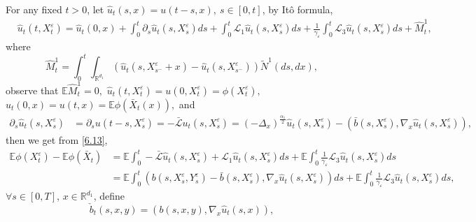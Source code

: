 \documentclass[11pt,reqno]{amsart}
\numberwithin{equation}{section}
\begin{document}
For any fixed $t>0$, let $\hat{u}_{t}(s,x)=u(t-s,x),\ s\in [0,t]$, by It\^{o} formula, 
\begin{equation}\label{6.13}
		\begin{split}
&\hat{u}_{t}(t,X_{t}^{\varepsilon})=\hat{u}_{t}(0,x)+\int_{0}^{t}\partial_{s}\hat{u}_{t}(s,X_{s}^{\varepsilon})ds+\int_{0}^{t}\mathcal{L}_{1}\hat{u}_{t}(s,X_{s}^{\varepsilon})ds+\frac{1}{\gamma_{\varepsilon}}\int_{0}^{t}\mathcal{L}_{3}\hat{u}_{t}(s,X_{s}^{\varepsilon})ds+\hat{M}^{1}_{t},
	\end{split}
\end{equation}
where $$ \hat{M}^{1}_{t}=\int_{0}^{t}\int_{\mathbb{R}^{d_{1}}}\left(  \hat{u}_{t}(s,X_{s^{-}}^{\varepsilon}+x)-\hat{u}_{t}(s,X_{s^{-}}^{\varepsilon})\right) \tilde{N}^{1}(ds,dx), $$
observe that $ \mathbb{E}\hat{M}^{1}_{t}=0,$ $\hat{u}_{t}(t,X_{t}^{\varepsilon})=u(0,X_{t}^{\varepsilon})=\phi(X_{t}^{\varepsilon}),$ $\hat{u}_{t}(0,x)=u(t,x)=\mathbb{E}\phi(\bar{X}_{t}(x)),$ and
\begin{equation}\nonumber
	\begin{split}
		\partial_{s}\hat{u}_{t}(s,X_{s}^{\varepsilon})&=\partial_{s}u(t-s,X_{s}^{\varepsilon})=-\mathcal{\bar{L}}u_{t}(s,X_{s}^{\varepsilon})=(-\Delta_{x})^{\frac{\alpha_{1}}{2}}\hat{u}_{t}(s,X_{s}^{\varepsilon})-( \bar{b}(s,X_{s}^{\varepsilon}),\nabla_{x}\hat{u}_{t}(s,X_{s}^{\varepsilon})),
	\end{split}
	\end{equation}
then we get from \eqref{6.13},
\begin{equation}\label{6.14}
	\begin{split}
	\mathbb{E}\phi(X_{t}^{\varepsilon})-\mathbb{E}\phi(\bar{X}_{t})
	&= \mathbb{E}\int_{0}^{t}-\mathcal{\bar{L}}\hat{u}_{t}(s,X_{s}^{\varepsilon})+\mathcal{L}_{1}\hat{u}_{t}(s,X_{s}^{\varepsilon})ds+\mathbb{E}\int_{0}^{t}\frac{1}{\gamma_{\varepsilon}}\mathcal{L}_{3}\hat{u}_{t}(s,X_{s}^{\varepsilon})ds\\
	&= \mathbb{E}\int_{0}^{t}(b(s,X_{s}^{\varepsilon},Y_{s}^{\varepsilon})- \bar{b}(s,X_{s}^{\varepsilon}),\nabla_{x}\hat{u}_{t}(s,X_{s}^{\varepsilon} ))ds+\mathbb{E}\int_{0}^{t}\frac{1}{\gamma_{\varepsilon}}\mathcal{L}_{3}\hat{u}_{t}(s,X_{s}^{\varepsilon})ds,
	\end{split}
\end{equation}
$\forall s\in [0,T]$, $x\in \mathbb{R}^{d_{1}} $, define 
\begin{equation}\label{6.15}
\check{b}_{t}(s,x,y)=( b(s,x,y),\nabla_{x}\hat{u}_{t}(s,x)),
\end{equation}
\end{document}
